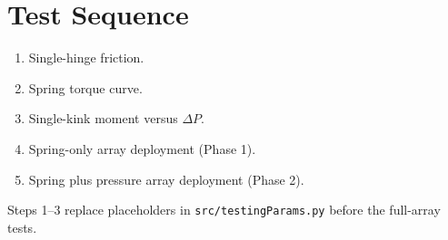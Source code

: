 \documentclass[11pt]{article}
\begin{document}
\section{Test Sequence}

\begin{enumerate}[noitemsep]
    \item Single-hinge friction.
    \item Spring torque curve.
    \item Single-kink moment versus $\Delta P$.
    \item Spring-only array deployment (Phase 1).
    \item Spring plus pressure array deployment (Phase 2).
\end{enumerate}
Steps 1--3 replace placeholders in \texttt{src/testingParams.py} before the full-array tests.
\end{document}
